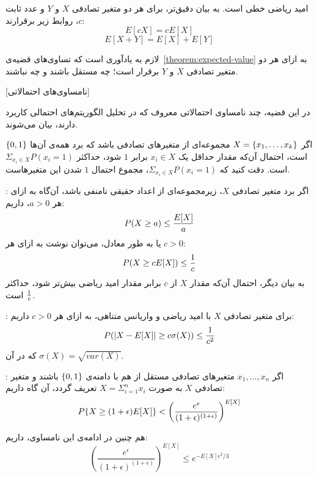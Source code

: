 امید ریاضی خطی است. به بیان دقیق‌تر، برای هر دو متغیر تصادفی $X$ و $Y$ و عدد ثابت $c$، روابط زیر برقرارند:
$$E[c X] = c E [X]$$
$$E[X + Y] = E[X] + E[Y]$$


لازم به یادآوری است که تساوی‌های قضیه‌ی~\ref{theorem:expected-value} به ازای هر دو متغیر تصادفی $X$ و $Y$ برقرار است؛ چه مستقل باشند و چه نباشند.

[نامساوی‌های احتمالاتی]

در این قضیه، چند نامساوی احتمالاتی معروف که در تحلیل الگوریتم‌های احتمالی کاربرد دارند، بیان می‌شوند.


 اگر $X = {\{ x_1, \ldots, x_k \}}$ مجموعه‌ای از متغیر‌های تصادفی باشد که برد همه‌ی آن‌ها ${\{ 0, 1 \}}$ است، احتمال آن‌که مقدار حد‌اقل یک $x_i \in X$ برابر $1$ شود، حد‌اکثر $\Sigma_{x_i \in X} P(x_i = 1)$ است. دقت کنید که $\Sigma_{x_i \in X} P(x_i = 1)$، مجموع احتمال $1$ شدن این متغیر‌هاست.

 :
اگر برد متغیر تصادفی $X$، زیر‌مجموعه‌ای از اعداد حقیقی نامنفی باشد، آن‌گاه به ازای هر $a > 0$، داریم:
$$P(X \geq a) \leq {{E[X]} \over {a}}$$
یا به طور معادل، می‌توان نوشت به ازای هر $c > 0$:
$$P(X \geq c E[X]) \leq {{1} \over {c}}$$
به بیان دیگر، احتمال آن‌که مقدار $X$ از $c$ برابر مقدار امید ریاضی بیش‌تر شود، حد‌اکثر ${1} \over {c}$ است.

 :
برای متغیر تصادفی $X$ با امید ریاضی و واریانس متناهی، به ازای هر $c > 0$ داریم:
$$P(|X - E[X]| \geq c \sigma(X)) \leq {{1} \over {c ^ 2}}$$
که در آن $\sigma(X) = \sqrt{var(X)}$.

 :
اگر $x_1, \ldots, x_n$
متغیرهای تصادفی مستقل از هم با دامنه‌ی ${\{ 0, 1 \}}$  باشند و متغیر تصادفی $X$ به صورت 
$X = \Sigma_{i = 1}^n x_i$
تعریف گردد، آن گاه داریم:
$$P{\{ X \geq (1+\epsilon)E[X] \}} < \left({{e^{\epsilon}}\over{(1+\epsilon)^{(1+\epsilon)}}}\right)^{E[X]}$$

هم چنین در ادامه‌ی این نامساوی، داریم:
$$(\frac{e^{\epsilon}}{(1+\epsilon)^{(1+\epsilon)}})^{E[X]} \leq e^{-{E[X]}\epsilon^2/3}$$




